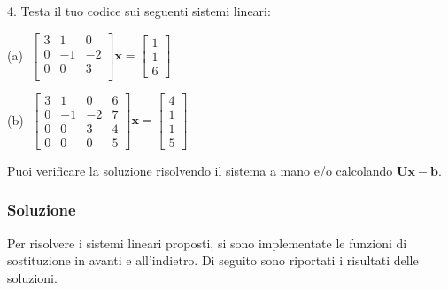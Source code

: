 \documentclass[letterpaper, 12pt]{article}
\begin{document}
4. Testa il tuo codice sui seguenti sistemi lineari:

    \begin{minipage}{0.48\textwidth}
        (a) $\;\begin{bmatrix}
            3 & 1 & 0  \\
            0 & -1 & -2  \\
            0 & 0 & 3  \\
            \end{bmatrix} \mathbf{x} = \begin{bmatrix}
            1 \\ 1 \\ 6
            \end{bmatrix}$
    \end{minipage}
    \hfill
    \begin{minipage}{0.48\textwidth}
        (b) $\;\begin{bmatrix}
            3 & 1 & 0 & 6 \\
            0 & -1 & -2 & 7 \\
            0 & 0 & 3 & 4 \\
            0 & 0 & 0 & 5
            \end{bmatrix} \mathbf{x} = \begin{bmatrix}
            4 \\ 1 \\ 1 \\ 5
            \end{bmatrix}$
    \end{minipage}

Puoi verificare la soluzione risolvendo il sistema a mano e/o calcolando $\mathbf{U}\mathbf{x} - \mathbf{b}$.



\subsubsection{Soluzione}
Per risolvere i sistemi lineari proposti, si sono implementate le funzioni di sostituzione in avanti e all'indietro. 
Di seguito sono riportati i risultati delle soluzioni.
\end{document}
